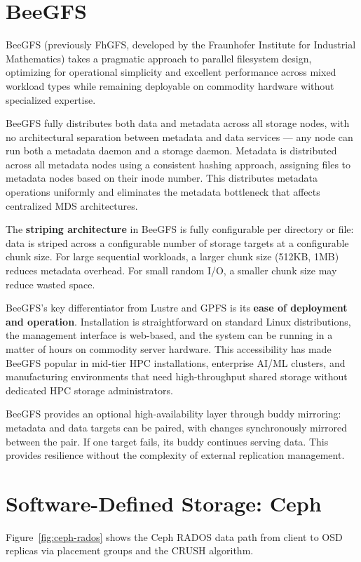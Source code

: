 \section{BeeGFS}
BeeGFS (previously FhGFS, developed by the Fraunhofer Institute for Industrial Mathematics) takes a pragmatic approach to parallel filesystem design, optimizing for operational simplicity and excellent performance across mixed workload types while remaining deployable on commodity hardware without specialized expertise.

BeeGFS fully distributes both data and metadata across all storage nodes, with no architectural separation between metadata and data services --- any node can run both a metadata daemon and a storage daemon. Metadata is distributed across all metadata nodes using a consistent hashing approach, assigning files to metadata nodes based on their inode number. This distributes metadata operations uniformly and eliminates the metadata bottleneck that affects centralized MDS architectures.

The \textbf{striping architecture} in BeeGFS is fully configurable per directory or file: data is striped across a configurable number of storage targets at a configurable chunk size. For large sequential workloads, a larger chunk size (512KB, 1MB) reduces metadata overhead. For small random I/O, a smaller chunk size may reduce wasted space.

BeeGFS's key differentiator from Lustre and GPFS is its \textbf{ease of deployment and operation}. Installation is straightforward on standard Linux distributions, the management interface is web-based, and the system can be running in a matter of hours on commodity server hardware. This accessibility has made BeeGFS popular in mid-tier HPC installations, enterprise AI/ML clusters, and manufacturing environments that need high-throughput shared storage without dedicated HPC storage administrators.

BeeGFS provides an optional high-availability layer through buddy mirroring: metadata and data targets can be paired, with changes synchronously mirrored between the pair. If one target fails, its buddy continues serving data. This provides resilience without the complexity of external replication management.

\section{Software-Defined Storage: Ceph}
Figure~\ref{fig:ceph-rados} shows the Ceph RADOS data path from client to OSD replicas via placement groups and the CRUSH algorithm.

